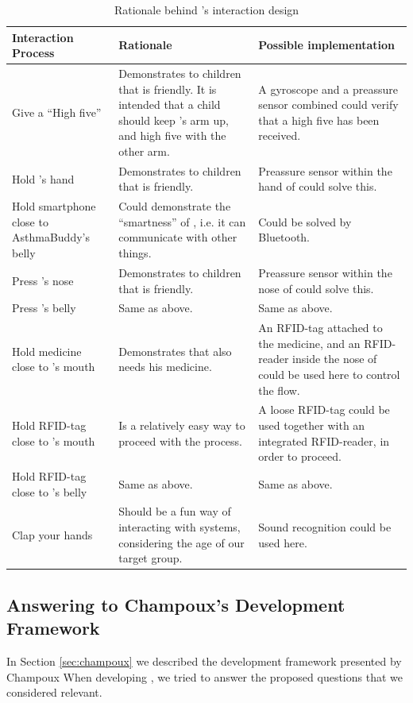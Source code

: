 \begin{table}[H]
	\begin{tabular}{| p{3.0cm} | p{5.5cm} | p{5.5cm} |}
		\hline
		\textbf{Interaction Process} & \textbf{Rationale} & \textbf{Possible implementation} \\
		\hline
		Give \buddy{} a ``High five'' & Demonstrates to children that \buddy{} is friendly. It is intended that a child should keep \buddy{}'s arm up, and high five \buddy{} with the other arm. & A gyroscope and a preassure sensor combined could verify that a high five has been received. \\
		\hline
		Hold \buddy{}'s hand & Demonstrates to children that \buddy{} is friendly. & Preassure sensor within the hand of \buddy{} could solve this. \\
		\hline
		Hold smartphone close to AsthmaBuddy's belly & Could demonstrate the ``smartness'' of \buddy{}, i.e. it can communicate with other things. & Could be solved by Bluetooth. \\
		\hline 
		Press \buddy{}'s nose & Demonstrates to children that \buddy{} is friendly. & Preassure sensor within the nose of \buddy{} could solve this. \\
		\hline
		Press \buddy{}'s belly & Same as above. & Same as above. \\
		\hline
		Hold medicine close to \buddy{}'s mouth & Demonstrates that \buddy{} also needs his medicine. & An RFID-tag attached to the medicine, and an RFID-reader inside the nose of \buddy{} could be used here to control the flow. \\ 
		\hline
		Hold RFID-tag close to \buddy{}'s mouth & Is a relatively easy way to proceed with the process. & A loose RFID-tag could be used together with an integrated RFID-reader, in order to proceed. \\ 
		\hline
		Hold RFID-tag close to \buddy{}'s belly & Same as above. & Same as above. \\
		\hline
		Clap your hands & Should be a fun way of interacting with systems, considering the age of our target group. & Sound recognition could be used here. \\ 
		\hline
	\end{tabular}
	\label{tab:interaction-rationale}
	\caption{Rationale behind \buddy{}'s interaction design}
\end{table}

\subsection{Answering to Champoux's Development Framework}
\label{sec:answeringchampoux}
In Section \ref{sec:champoux} we described the development framework presented by Champoux \etal{} When developing \buddy{}, we tried to answer the proposed questions that we considered relevant. 

